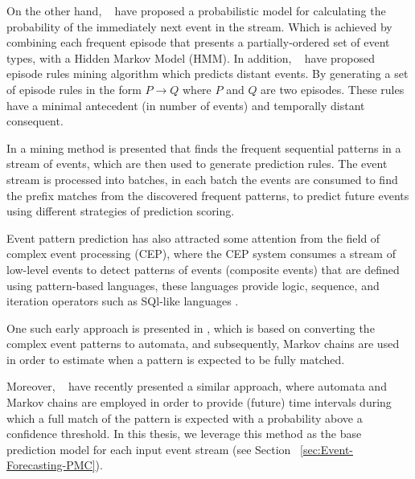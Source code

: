 \par On the other hand, ~\citet{laxman_stream_2008} have proposed a probabilistic model for calculating the probability of the immediately next event in the stream. Which is achieved by combining each frequent episode \cite{mannila1997discovery} that presents a partially-ordered set of event types, with a Hidden Markov Model (HMM). In addition, ~\citet{fahed_efficient_2014} have proposed episode rules mining algorithm which predicts distant events. By generating a set of episode rules in the form \(P \rightarrow Q \) where $P$ and $Q$ are two episodes. These rules have a minimal antecedent (in number of events) and temporally distant consequent.

\par In \cite{zhou_pattern_2015} a mining method is presented that finds the frequent sequential patterns in a stream of events, which are then used to generate prediction rules. The event stream is processed into batches, in each batch the events are consumed to find the prefix matches from the discovered frequent patterns, to predict future events using different strategies of prediction scoring.

\par Event pattern prediction has also attracted some attention from the field of complex event processing (CEP), where the CEP system consumes a stream of low-level events to detect patterns of events (composite events) that are defined using pattern-based languages, these languages provide logic, sequence, and iteration operators such as SQl-like languages \cite{Cugola:2012:PFI:2187671.2187677}. 
\par One such early approach is presented in \cite{muthusamy_predictive_2010}, which is based on converting the complex event patterns to automata, and subsequently, Markov chains are used in order to estimate when a pattern is expected to be fully matched. 
\par Moreover, ~\citet{alevizos2017event} have recently presented a similar approach, where automata and Markov chains are employed in order to provide (future) time intervals during which a full match of the pattern is expected with a probability above a confidence threshold. In this thesis, we leverage this method as the base prediction model for each input event stream (see Section ~\ref{sec:Event-Forecasting-PMC}). 
